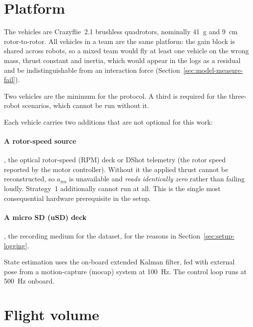\section{Platform}
\label{sec:setup-platform}

The vehicles are Crazyflie~2.1 brushless quadrotors, nominally \SI{41}{\gram} and
\SI{9}{\centi\metre} rotor-to-rotor. All vehicles in a team are the same platform: the gain block
is shared across robots, so a mixed team would fly at least one vehicle on the wrong mass, thrust
constant and inertia, which would appear in the logs as a residual and be indistinguishable from
an interaction force (Section~\ref{sec:model-measure-fail}).

Two vehicles are the minimum for the protocol. A third is required for the three-robot scenarios,
which cannot be run without it.

Each vehicle carries two additions that are not optional for this work:

\paragraph{A rotor-speed source}, the optical rotor-speed (RPM) deck or DShot telemetry (the rotor
speed reported by the motor controller). Without it the applied
thrust cannot be reconstructed, so $a_{\mathrm{res}}$ is unavailable and \emph{reads identically
zero} rather than failing loudly. Strategy~1 additionally cannot run at all. This is the
single most consequential hardware prerequisite in the setup.

\paragraph{A micro SD (uSD) deck}, the recording medium for the dataset, for the reasons in
Section~\ref{sec:setup-logging}.

State estimation uses the on-board extended Kalman filter, fed with external pose from a
motion-capture (mocap) system at \SI{100}{\hertz}. The control loop runs at \SI{500}{\hertz} onboard.

\section{Flight volume}
\label{sec:setup-volume}


